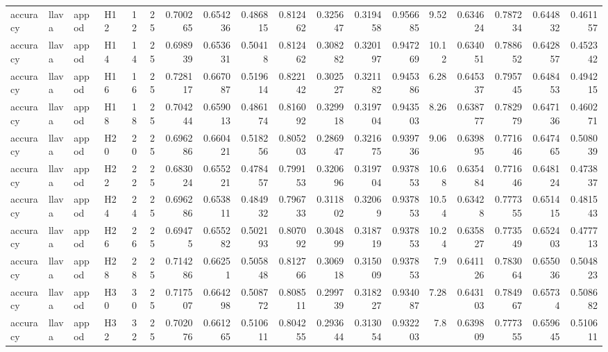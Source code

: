 \begin{longtable}{llllrrrrrrrrrrrrrr}
accuracy & llava & appod & H12 & 12 & 25 & 0.700265 & 0.654236 & 0.486815 & 0.812462 & 0.325647 & 0.319458 & 0.956685 & 9.52 & 0.634624 & 0.787234 & 0.644832 & 0.461157 \\
accuracy & llava & appod & H14 & 14 & 25 & 0.698939 & 0.653631 & 0.50418 & 0.812462 & 0.308282 & 0.320197 & 0.947269 & 10.12 & 0.634051 & 0.788652 & 0.642857 & 0.452342 \\
accuracy & llava & appod & H16 & 16 & 25 & 0.728117 & 0.667087 & 0.519614 & 0.822142 & 0.302527 & 0.321182 & 0.945386 & 6.28 & 0.645337 & 0.795745 & 0.648453 & 0.494215 \\
accuracy & llava & appod & H18 & 18 & 25 & 0.704244 & 0.659013 & 0.486174 & 0.816092 & 0.329918 & 0.319704 & 0.943503 & 8.26 & 0.638777 & 0.782979 & 0.647136 & 0.460271 \\
accuracy & llava & appod & H20 & 20 & 25 & 0.696286 & 0.660421 & 0.518256 & 0.805203 & 0.286947 & 0.321675 & 0.939736 & 9.06 & 0.639895 & 0.771646 & 0.647465 & 0.508039 \\
accuracy & llava & appod & H22 & 22 & 25 & 0.683024 & 0.655221 & 0.478457 & 0.799153 & 0.320696 & 0.319704 & 0.937853 & 10.68 & 0.635484 & 0.771646 & 0.648124 & 0.473837 \\
accuracy & llava & appod & H24 & 24 & 25 & 0.696286 & 0.653811 & 0.484932 & 0.796733 & 0.311802 & 0.32069 & 0.937853 & 10.54 & 0.63428 & 0.777355 & 0.651415 & 0.481543 \\
accuracy & llava & appod & H26 & 26 & 25 & 0.69475 & 0.655282 & 0.502193 & 0.807092 & 0.304899 & 0.318719 & 0.937853 & 10.24 & 0.635827 & 0.773549 & 0.652403 & 0.477713 \\
accuracy & llava & appod & H28 & 28 & 25 & 0.714286 & 0.66251 & 0.505848 & 0.812766 & 0.306918 & 0.315009 & 0.937853 & 7.9 & 0.641126 & 0.783064 & 0.655036 & 0.504823 \\
accuracy & llava & appod & H30 & 30 & 25 & 0.717507 & 0.664298 & 0.508772 & 0.808511 & 0.299739 & 0.318227 & 0.934087 & 7.28 & 0.643103 & 0.784967 & 0.65734 & 0.508682 \\
accuracy & llava & appod & H32 & 32 & 25 & 0.702076 & 0.661265 & 0.510611 & 0.804255 & 0.293644 & 0.313054 & 0.932203 & 7.8 & 0.639809 & 0.777355 & 0.659645 & 0.510611 \\
\end{longtable}
